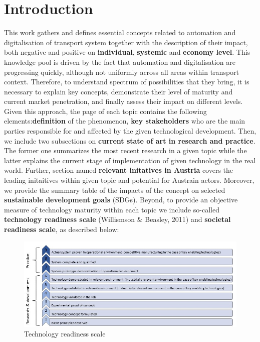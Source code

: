 \documentclass[
]{book}
\begin{document}
\hypertarget{intro}{%
\chapter{Introduction}\label{intro}}

This work gathers and defines essential concepts related to automation and digitalisation of transport system together with the description of their impact, both negative and positive on \textbf{individual}, \textbf{systemic} and \textbf{economy level}. This knowledge pool is driven by the fact that automation and digitalisation are progressing quickly, although not uniformly across all areas within transport context. Therefore, to understand spectrum of possibilities that they bring, it is necessary to explain key concepts, demonstrate their level of maturity and current market penetration, and finally assess their impact on different levels. Given this approach, the page of each topic contains the following elements:\textbf{definition} of the phenomenon,
\textbf{key stakeholders} who are the main parties responsible for and affected by the given technological development. Then, we include two subsections on \textbf{current state of art in research and practice}. The former one summarizes the most recent research in a given topic while the latter explains the current stage of implementation of given technology in the real world. Further, section named \textbf{relevant initatives in Austria} covers the leading initaitives within given topic and potential for Austrain actors. Moreover, we provide the summary table of the impacts of the concept on selected \textbf{sustainable development goals} (SDGs). Beyond, to provide an objective measure of technology maturity within each topic we include so-called \textbf{technology readiness scale} (Willismson \& Beasley, 2011) and \textbf{societal readiness scale}, as described below:

\begin{figure}
\includegraphics[width=2\linewidth]{image/TRL} \caption{Technology readiness scale}\label{fig:unnamed-chunk-2}
\end{figure}
\end{document}
